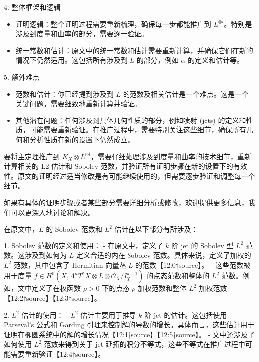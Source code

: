 \documentclass[lang=cn,12pt,fontset=none,a4paper]{beautybook}
\begin{document}
4. 整体框架和逻辑

\begin{itemize}
      \item 证明逻辑：整个证明过程需要重新梳理，确保每一步都能推广到 $L^{\otimes l}$。特别是涉及到度量和曲率的部分，需要逐一验证。
      
      \item 统一常数和估计：原文中的统一常数和估计需要重新计算，并确保它们在新的情况下仍然适用。这包括所有涉及到 $L$ 的部分，例如 $α$ 的定义和估计等。
\end{itemize}
   

5. 额外难点
\begin{itemize}
      \item 范数和估计：你已经提到涉及到 $L$ 的范数及相关估计是一个难点。这是一个关键问题，需要细致地重新计算并验证。
      
      \item 其他潜在问题：任何涉及到具体几何性质的部分，例如喷射 (jets) 的定义和性质，可能需要重新验证。在推广过程中，需要特别关注这些细节，确保所有几何和分析性质在新的设置下仍然成立。
\end{itemize}
   


要将主定理推广到 $K_X \otimes L^{\otimes l}$，需要仔细处理涉及到度量和曲率的技术细节，重新计算相关的 L2 估计和 Sobolev 范数，并验证所有证明步骤在新的设置下的有效性。原文的证明经过适当修改是有可能继续使用的，但需要逐步验证和调整每一个细节。

如果有具体的证明步骤或者某些部分需要详细分析或修改，欢迎提供更多信息，我们可以更深入地讨论和解决。


在原文中，$L$ 的 Sobolev 范数和 $L^2$ 估计在以下部分有所涉及：

1. Sobolev 范数的定义和使用：
   - 在原文中，定义了 $k$ 阶 jet 的 Sobolev 型 $L^2$ 范数。这涉及到如何为 $L$ 定义合适的内在 Sobolev 范数。具体来说，定义了加权的 $L^2$ 范数，其中包含了 Hermitian 向量丛 $L$ 的范数【12:0†source】。
   - 这些范数被用于度量 $f \in H^0(X, \Lambda^n T^*X \otimes L \otimes \mathcal{O}_X / I^{k+1}_Y)$ 的点态范数和整体的 $L^2$ 范数。例如，文中定义了在权函数 $\rho > 0$ 下的点态 $\rho$ 加权范数和整体 $L^2$ 加权范数【12:2†source】【12:3†source】。

2. $L^2$ 估计的使用：
   - $L^2$ 估计主要用于推导 $k$ 阶 jet 的估计。这包括使用 Parseval's 公式和 Garding 引理来控制解的导数的增长。具体而言，这些估计用于证明在椭圆系统中的解的增长情况【12:1†source】【12:5†source】。
   - 文中还涉及了如何使用 $L^2$ 范数来得到关于 jet 延拓的积分不等式，这些不等式在推广过程中可能需要重新验证【12:4†source】。
\end{document}
